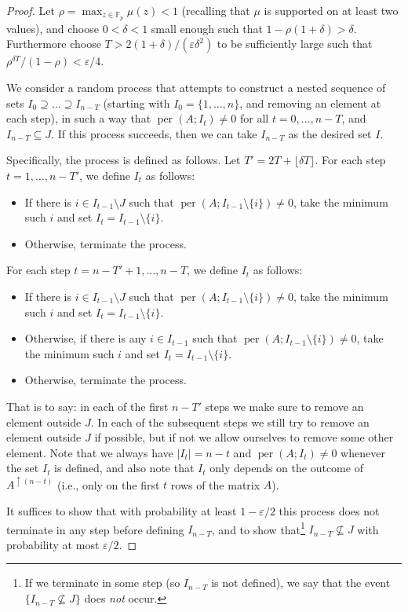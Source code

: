 \documentclass[10pt,a4paper]{amsart}
\newcommand{\eps}{\varepsilon}
\newcommand{\mb}{\mathbb}
\newcommand{\on}{\operatorname}
\begin{document}
\begin{proof} Let $\rho=\max_{z\in\mb F_{p}}\mu(z)<1$ (recalling that $\mu$
is supported on at least two values), and choose $0<\delta<1$
small enough such that $1-\rho(1+\delta)>\delta$. Furthermore choose $T>2(1+\delta)/(\eps\delta^2)$ to be sufficiently large such that $\rho^{\delta T}/(1-\rho)<\eps/4$.

We consider a random process that attempts to construct a nested sequence
of sets $I_{0}\supseteq\dots\supseteq I_{n-T}$ (starting with $I_{0}=\{1,\dots,n\}$,
and removing an element at each step), in such a way that $\on{per}(A;I_{t})\ne0$
for all $t=0,\dots,n-T$, and $I_{n-T}\subseteq J$. If this process succeeds,
then we can take $I_{n-T}$ as the desired set $I$.

Specifically, the process is defined as follows. Let $T'=2T+\lfloor \delta T\rfloor$. For each step $t=1,\dots,n-T'$, we define $I_t$ as follows:
\begin{itemize}
\item If there is $i\in I_{t-1}\setminus J$ such that $\on{per}(A;I_{t-1}\setminus\{i\})\ne0$, take the minimum such $i$ and
set $I_{t}=I_{t-1}\setminus\{i\}$.
\item Otherwise, terminate the process.
\end{itemize}
For each step $t=n-T'+1,\dots, n-T$, we define $I_t$ as follows:
\begin{itemize}
\item If there is $i\in I_{t-1}\setminus J$ such that $\on{per}(A;I_{t-1}\setminus\{i\})\ne0$, take the minimum such $i$ and
set $I_{t}=I_{t-1}\setminus\{i\}$.
\item Otherwise, if there is any $i\in I_{t-1}$ such that $\on{per}(A;I_{t-1}\setminus\{i\})\ne0$, take the minimum such $i$ and
set $I_{t}=I_{t-1}\setminus\{i\}$.
\item Otherwise, terminate the process.
\end{itemize}
That is to say: in each of the first $n-T'$ steps we make sure to
remove an element outside $J$. In each of the subsequent
steps we still try to remove an element outside $J$ if possible,
but if not we allow ourselves to remove some other element. Note that we always have $|I_t|=n-t$ and $\on{per}(A;I_{t})\ne0$ whenever the set $I_t$ is defined, and also note that $I_t$ only depends on the outcome of $A^{\uparrow (n-t)}$ (i.e., only on the first $t$ rows of the matrix $A$).

It suffices to show that with probability at least $1-\varepsilon/2$
this process does not terminate in any step before defining $I_{n-T}$, and to show
that\footnote{If we terminate in some step (so $I_{n-T}$ is not defined), we say that the event $\{I_{n-T}\not \subseteq J\}$ does \emph{not} occur.} $I_{n-T}\nsubseteq J$ with probability at most $\varepsilon/2$.


\end{proof}
\end{document}
